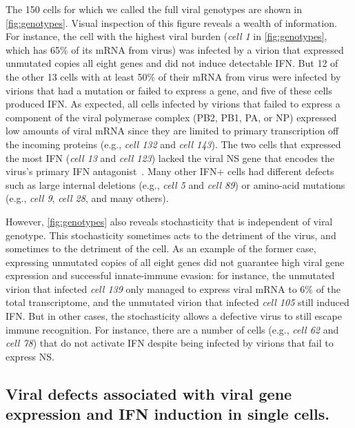 \documentclass[]{asm-article}
\newcommand{\FIG}[1]{\autoref{fig:#1}}
\begin{document}
The 150 cells for which we called the full viral genotypes are shown in \FIG{genotypes}.
Visual inspection of this figure reveals a wealth of information.
For instance, the cell with the highest viral burden (\textit{cell 1} in \FIG{genotypes}, which has 65\% of its mRNA from virus) was infected by a virion that expressed unmutated copies all eight genes and did not induce detectable IFN.
But 12 of the other 13 cells with at least 50\% of their mRNA from virus were infected by virions that had a mutation or failed to express a gene, and five of these cells produced IFN.
As expected, all cells infected by virions that failed to express a component of the viral polymerase complex (PB2, PB1, PA, or NP) expressed low amounts of viral mRNA since they are limited to primary transcription off the incoming proteins (e.g., \textit{cell 132} and \textit{cell 143}).
The two cells that expressed the most IFN (\textit{cell 13} and \textit{cell 123}) lacked the viral NS gene that encodes the virus's primary IFN antagonist~\cite{garcia1998influenza, hale2008multifunctional}.
Many other IFN+ cells had different defects such as large internal deletions (e.g., \textit{cell 5} and \textit{cell 89}) or amino-acid mutations (e.g., \textit{cell 9}, \textit{cell 28}, and many others).

However, \FIG{genotypes} also reveals stochasticity that is independent of viral genotype.
This stochasticity sometimes acts to the detriment of the virus, and sometimes to the detriment of the cell.
As an example of the former case, expressing unmutated copies of all eight genes did not guarantee high viral gene expression and successful innate-immune evasion: for instance, the unmutated virion that infected \textit{cell 139} only managed to express viral mRNA to 6\% of the total transcriptome, and the unmutated virion that infected \textit{cell 105} still induced IFN.
But in other cases, the stochasticity allows a defective virus to still escape immune recognition.
For instance, there are a number of cells (e.g., \textit{cell 62} and \textit{cell 78}) that do not activate IFN despite being infected by virions that fail to express NS.

\subsection{Viral defects associated with viral gene expression and IFN induction in single cells.}
\end{document}
